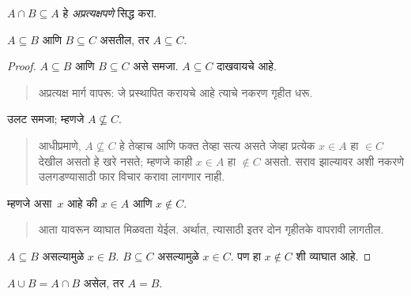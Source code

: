 \documentclass[../../../include/open-logic-section]{subfiles}
\begin{document}
\begin{prob}
$A \cap B \subseteq A$ हे \emph{अप्रत्यक्षपणे} सिद्ध करा.
\end{prob}

\begin{prop}
$A \subseteq B$ आणि $B \subseteq C$ असतील, तर $A \subseteq C$.
\end{prop}

\begin{proof}
$A \subseteq B$ आणि $B \subseteq C$ असे समजा. $A \subseteq C$ दाखवायचे आहे.
\begin{quote}
अप्रत्यक्ष मार्ग वापरू: जे प्रस्थापित करायचे आहे त्याचे नकरण गृहीत धरू.
\end{quote}
उलट समजा; म्हणजे $A \nsubseteq C$.
\begin{quote}
आधीप्रमाणे, $A \nsubseteq C$ हे तेव्हाच आणि फक्त तेव्हा सत्य असते जेव्हा प्रत्येक $x \in A$ हा $\in C$ देखील असतो हे खरे नसते; म्हणजे काही $x \in A$ हा $\notin C$ असतो. सराव झाल्यावर अशी नकरणे उलगडण्यासाठी फार विचार करावा लागणार नाही.
\end{quote}
म्हणजे असा~$x$ आहे की $x \in A$ आणि $x \notin C$.
\begin{quote}
आता यावरून व्याघात मिळवता येईल. अर्थात, त्यासाठी इतर दोन गृहीतके वापरावी लागतील.
\end{quote}
$A \subseteq B$ असल्यामुळे $x \in B$. $B \subseteq C$ असल्यामुळे $x \in C$. पण हा $x \notin C$ शी व्याघात आहे.
\end{proof}

\begin{prop}
$A \cup B = A \cap B$ असेल, तर $A = B$.
\end{prop}
\end{document}

